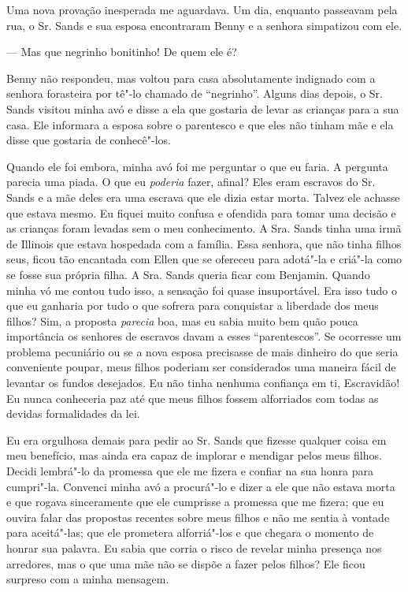 Uma nova provação inesperada me
aguardava. Um dia, enquanto passeavam pela rua, o Sr. Sands e sua esposa
encontraram Benny e a senhora simpatizou com ele.

--- Mas que negrinho bonitinho! De quem ele é?

Benny não respondeu, mas voltou para
casa absolutamente indignado com a senhora forasteira por tê"-lo chamado
de ``negrinho''. Alguns dias depois, o Sr. Sands visitou minha avó e
disse a ela que gostaria de levar as crianças para a sua casa. Ele
informara a esposa sobre o parentesco e que eles não tinham mãe e ela
disse que gostaria de conhecê"-los.

Quando ele foi embora, minha avó foi me
perguntar o que eu faria. A pergunta parecia uma piada. O que eu
\emph{poderia} fazer, afinal? Eles eram escravos do Sr. Sands e a mãe
deles era uma escrava que ele dizia estar morta. Talvez ele achasse que
estava mesmo. Eu fiquei muito confusa e ofendida para tomar uma decisão
e as crianças foram levadas sem o meu conhecimento. A Sra. Sands tinha
uma irmã de Illinois que estava hospedada com a família. Essa senhora,
que não tinha filhos seus, ficou tão encantada com Ellen que se ofereceu
para adotá"-la e criá"-la como se fosse sua própria filha. A Sra. Sands
queria ficar com Benjamin. Quando minha vó me contou tudo isso, a
sensação foi quase insuportável. Era isso tudo o que eu ganharia por
tudo o que sofrera para conquistar a liberdade dos meus filhos? Sim, a
proposta \emph{parecia} boa, mas eu sabia muito bem quão pouca
importância os senhores de escravos davam a esses ``parentescos''. Se
ocorresse um problema pecuniário ou se a nova esposa precisasse de mais
dinheiro do que seria conveniente poupar, meus filhos poderiam ser
considerados uma maneira fácil de levantar os fundos desejados. Eu não
tinha nenhuma confiança em ti, Escravidão! Eu nunca conheceria paz até
que meus filhos fossem alforriados com todas as devidas formalidades da
lei.

Eu era orgulhosa demais para pedir ao
Sr. Sands que fizesse qualquer coisa em meu benefício, mas ainda era
capaz de implorar e mendigar pelos meus filhos. Decidi lembrá"-lo da
promessa que ele me fizera e confiar na sua honra para cumpri"-la.
Convenci minha avó a procurá"-lo e dizer a ele que não estava morta e que
rogava sinceramente que ele cumprisse a promessa que me fizera; que eu
ouvira falar das propostas recentes sobre meus filhos e não me sentia à
vontade para aceitá"-las; que ele prometera alforriá"-los e que chegara o
momento de honrar sua palavra. Eu sabia que corria o risco de revelar
minha presença nos arredores, mas o que uma mãe não se dispõe a fazer
pelos filhos? Ele ficou surpreso com a minha mensagem.

